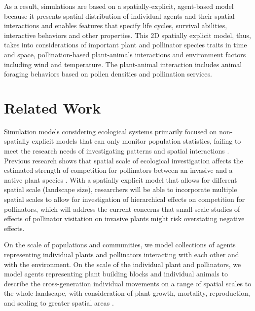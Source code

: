 \documentclass[3p,,preprint,12pt]{elsarticle}
\begin{document}
As a result, simulations are based on a spatially-explicit, agent-based model because it presents spatial distribution of individual agents and their spatial interactions and enables features that specify life cycles, survival abilities, interactive behaviors and other properties. This 2D spatially explicit model, thus, takes into considerations of important plant and pollinator species traits in time and space, pollination-based plant-animals interactions and environment factors including wind and temperature. The plant-animal interaction includes animal foraging behaviors based on pollen densities and pollination services. 

\section{Related Work}

Simulation models considering ecological systems primarily focused on non-spatially explicit models that can only monitor population statistics, failing to meet the research needs of investigating patterns and spatial interactions \cite{Ward200016}. Previous research shows that spatial scale of ecological investigation affects the estimated strength of competition for pollinators between an invasive and a native plant species \cite{Jakobsson2009138}. With a spatially explicit model that allows for different spatial scale (landscape size), researchers will be able to incorporate multiple spatial scales to allow for investigation of hierarchical effects on competition for pollinators, which will address the current concerns that small-scale studies of effects of pollinator visitation on invasive plants might risk overstating negative effects. 

On the scale of populations and communities, we model collections of agents representing individual plants and pollinators interacting with each other and with the environment. On the scale of the individual plant and pollinators, we model agents representing plant building blocks and individual animals to describe the cross-generation individual movements on a range of spatial scales to the whole landscape, with consideration of plant growth, mortality, reproduction, and scaling to greater spatial areas \cite{10.1093/aob/mcaa043}.
\end{document}
